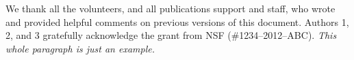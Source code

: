 \documentclass[sigchi, review]{acmart}
\begin{document}
\begin{CJK*}{UTF8}{gbsn}

\maketitle











\begin{acks}

We thank all the volunteers, and all publications support and staff, who wrote and provided helpful comments on previous versions of this document. Authors 1, 2, and 3 gratefully acknowledge the grant from NSF (\#1234--2012--ABC). \textit{This whole paragraph is just an example.}

\end{acks}




\end{CJK*}
\end{document}
